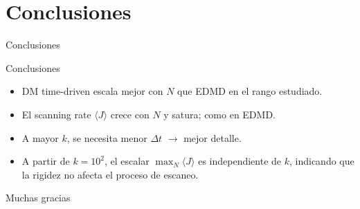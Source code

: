 \documentclass[10pt,aspectratio=169]{beamer}
\begin{document}
\section{Conclusiones}

\begin{frame}[plain,c]
    \centering
    {\fontsize{48}{56}\selectfont Conclusiones\par}
\end{frame}

\begin{frame}{Conclusiones}
    \begin{itemize}\setlength\itemsep{4pt}
        \item DM time-driven escala mejor con $N$ que EDMD en el rango estudiado.
        \item El scanning rate $\langle J\rangle$ crece con $N$ y satura; como en EDMD.
        \item A mayor $k$, se necesita menor $\Delta t$ $\rightarrow$ mejor detalle.
        \item A partir de $k = 10^{2}$, el escalar $\max_N \langle J\rangle$ es independiente de $k$, indicando que la rigidez no afecta el proceso de escaneo.
    \end{itemize}
\end{frame}

{
    \begin{frame}[plain,c]
        \centering
        {\fontsize{48}{56}\selectfont Muchas gracias\par}
    \end{frame}
}
\end{document}
